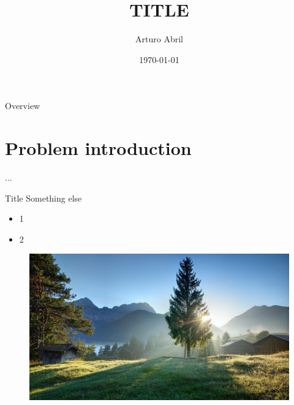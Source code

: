 \documentclass[aspectratio=169,xcolor=dvipsnames]{beamer}
\title{TITLE}
\author{Arturo Abril}
\institute
{
    Vrije Universiteit Amsterdam
}
\date{\today} %
\begin{document}
\begin{frame}
    \titlepage
\end{frame}

\begin{frame}{Overview}
    \tableofcontents
\end{frame}

\section{Problem introduction}

\begin{frame}
    \huge{...}
\end{frame}

\begin{frame}{Title}
    Something else
    \vfill
    \begin{itemize}
        \item 1
        \vfill
        \item 2
    \end{itemize}
\end{frame}

\begin{frame}{}
    \begin{figure}
        \includegraphics[width=0.8\linewidth]{1.jpg}
    \end{figure}
\end{frame}
\end{document}

